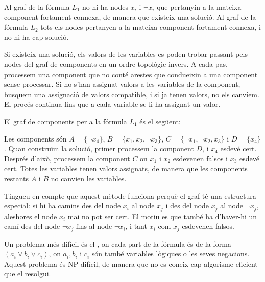 Al graf de la fórmula $L_1$ no hi ha nodes $x_i$ i $\lnot x_i$ que
pertanyin a la mateixa component fortament connexa, de manera que
existeix una solució. Al graf de la fórmula $L_2$ tots els nodes
pertanyen a la mateixa component fortament connexa, i no hi ha cap
solució.

Si existeix una solució, els valors de les variables es poden trobar
passant pels nodes del graf de components en un ordre topològic
invers. A cada pas, processem una component que no conté arestes que
condueixin a una component sense processar. Si no s'han assignat
valors a les variables de la component, busquem una assignació de
valors compatible, i si ja tenen valors, no els canviem. El procés
continua fins que a cada variable se li ha assignat un valor.

El graf de components per a la fórmula $L_1$ és el següent:
\begin{center}
\end{center}


Les components són $A = \{\lnot x_4\}$, $B = \{x_1, x_2, \lnot x_3\}$,
$C = \{\lnot x_1, \lnot x_2, x_3\}$ i $ D = \{x_4\}$. Quan construïm
la solució, primer processem la component $D$, i $x_4$ esdevé
cert. Després d'això, processem la component $C$ on $x_1$ i $x_2$
esdevenen falsos i $x_3$ esdevé cert. Totes les variables tenen valors
assignats, de manera que les components restants $A$ i $B$ no canvien
les variables.

Tingueu en compte que aquest mètode funciona perquè el graf té una
estructura especial: si hi ha camins des del node $x_i$ al node $x_j$
i des del node $x_j$ al node $\lnot x_j$, aleshores el node $x_i$ mai
no pot ser cert. El motiu es que també ha d'haver-hi un camí des del node
$\lnot x_j$ fins al node $\lnot x_i$, i tant $x_i$ com $x_j$ esdevenen
falsos.


Un problema més difícil és el , on cada part de la
fórmula és de la forma $(a_i \lor b_i \lor c_i)$, on $a_i, b_i$ i
$c_i$ són també variables lògiques o les seves negacions. Aquest
problema és NP-difícil, de manera que no es coneix cap algorisme
eficient que el resolgui.


